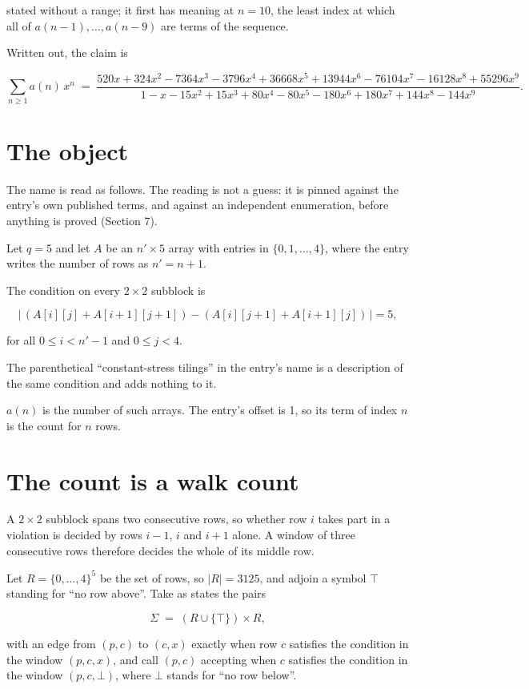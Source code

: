 \documentclass[11pt]{article}
\theoremstyle{definition}
\begin{document}
stated without a range; it first has meaning at $n = 10$, the least index at which all of $a(n-1),\dots,a(n-9)$ are terms of the sequence.

Written out, the claim is

\[\sum_{n \ge 1} a(n)\,x^n \;=\; \frac{520x + 324x^{2} - 7364x^{3} - 3796x^{4} + 36668x^{5} + 13944x^{6} - 76104x^{7} - 16128x^{8} + 55296x^{9}}{1 - x - 15x^{2} + 15x^{3} + 80x^{4} - 80x^{5} - 180x^{6} + 180x^{7} + 144x^{8} - 144x^{9}}.\]

\section{The object}

The name is read as follows. The reading is not a guess: it is pinned against the entry's own published terms, and against an independent enumeration, before anything is proved (Section 7).

Let $q = 5$ and let $A$ be an $n' \times 5$ array with entries in $\{0,1,\dots,4\}$, where the entry writes the number of rows as $n' = n + 1$.

The condition on every $2 \times 2$ subblock is

\[\bigl|\,(A[i][j] + A[i{+}1][j{+}1]) - (A[i][j{+}1] + A[i{+}1][j])\,\bigr| = 5,\]

for all $0 \le i < n'-1$ and $0 \le j < 4$.

The parenthetical ``constant-stress tilings'' in the entry's name is a description of the same condition and adds nothing to it.

$a(n)$ is the number of such arrays. The entry's offset is 1, so its term of index $n$ is the count for $n$ rows.

\section{The count is a walk count}

A $2 \times 2$ subblock spans two consecutive rows, so whether row $i$ takes part in a violation is decided by rows $i-1$, $i$ and $i+1$ alone. A window of three consecutive rows therefore decides the whole of its middle row.

Let $R = \{0,\dots,4\}^{5}$ be the set of rows, so $|R| = 3125$, and adjoin a symbol $\top$ standing for ``no row above''. Take as states the pairs

\[\Sigma \;=\; (R \cup \{\top\}) \times R,\]

with an edge from $(p,c)$ to $(c,x)$ exactly when row $c$ satisfies the condition in the window $(p,c,x)$, and call $(p,c)$ accepting when $c$ satisfies the condition in the window $(p,c,\bot)$, where $\bot$ stands for ``no row below''.
\end{document}
